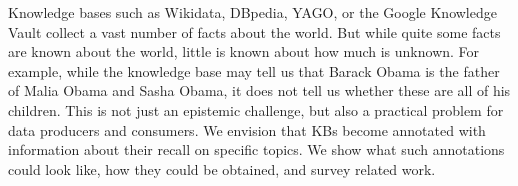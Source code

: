Knowledge bases such as Wikidata, DBpedia, YAGO, or the Google Knowledge Vault collect a vast number of facts about the world. But while quite some facts are known about the world, little is known about how much is unknown. For example, while the knowledge base may tell us that Barack Obama is the father of Malia Obama and Sasha Obama, it does not tell us whether these are all of his children. This is not just an epistemic challenge, but also a practical problem for data producers and consumers. We envision that KBs become annotated with information about their recall on specific topics. We show what such annotations could look like, how they could be obtained, and survey related work.
